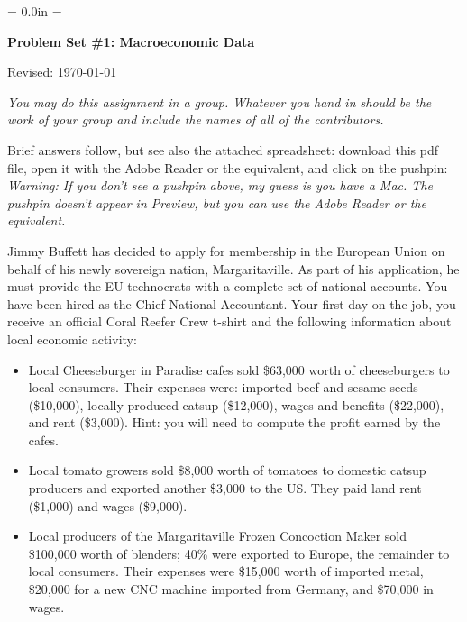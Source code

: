 \documentclass[12pt]{exam}
\def\HeadName{Problem Set \#1}
\begin{document}
\parindent = 0.0in
\parskip = \bigskipamount
\thispagestyle{empty}%
\Head

\centerline{\large \bf \HeadName: Macroeconomic Data}
\centerline{Revised:  \today}

\medskip
{\it You may do this assignment in a group.
Whatever you hand in should be the work of your group
and include the names of all of the contributors.}

\begin{questions}

\begin{solution}
Brief answers follow,
but see also the attached spreadsheet:
download this pdf file, open it with the Adobe Reader or the equivalent,
and click on the pushpin:
 \\
{\it Warning:  If you don't see a pushpin above, my guess is you have a Mac.
The pushpin doesn't appear in Preview,
but you can use the Adobe Reader or the equivalent.}
\end{solution}


Jimmy Buffett has decided to apply for membership in the European Union
on behalf of his newly sovereign nation, Margaritaville.
As part of his application, he must provide the EU
technocrats with a complete set of national accounts.
You have been hired as the Chief National Accountant.
Your first day on the job,
you receive an official Coral Reefer Crew{\texttrademark} t-shirt
and the following information about local economic activity:
%
\begin{itemize}
\item Local Cheeseburger in Paradise{\texttrademark} cafes
sold \$63,000 worth of cheeseburgers to local consumers.
Their expenses were:  imported beef and sesame seeds (\$10,000),
locally produced catsup (\$12,000),
wages and benefits (\$22,000), and rent (\$3,000).
Hint: you will need to compute the profit earned by the cafes.

\item Local tomato growers sold \$8,000 worth of tomatoes to domestic
catsup producers and exported another \$3,000 to the US.
They paid land rent (\$1,000) and wages (\$9,000).

\item Local producers of the Margaritaville Frozen Concoction Maker{\texttrademark }
sold \\ \$100,000 worth of blenders;
40\% were exported to Europe, the remainder to local consumers.
Their expenses were \$15,000 worth of imported metal,
\$20,000 for a new CNC machine imported from Germany,
and \$70,000 in wages.


\end{itemize}
\end{questions}
\end{document}
